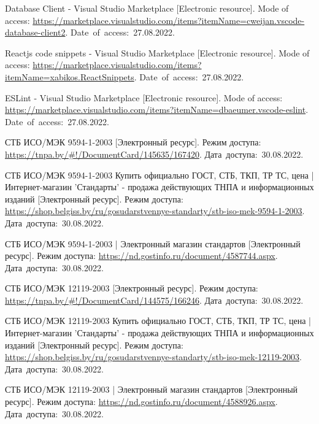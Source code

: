 \begin{thebibliography}{}
    Database Client - Visual Studio Marketplace
    [Electronic resource].
    Mode of access: \url{https://marketplace.visualstudio.com/items?itemName=cweijan.vscode-database-client2}.
    Date~of~access:~27.08.2022.
  
    Reactjs code snippets - Visual Studio Marketplace
    [Electronic resource].
    Mode of access: \url{https://marketplace.visualstudio.com/items?itemName=xabikos.ReactSnippets}.
    Date~of~access:~27.08.2022.
  
    ESLint - Visual Studio Marketplace
    [Electronic resource].
    Mode of access: \url{https://marketplace.visualstudio.com/items?itemName=dbaeumer.vscode-eslint}.
    Date~of~access:~27.08.2022.
  
  
  
    СТБ ИСО/МЭК 9594-1-2003
    [Электронный ресурс].
    Режим доступа: \url{https://tnpa.by/#!/DocumentCard/145635/167420}.
    Дата~доступа:~30.08.2022.
  
    СТБ ИСО/МЭК 9594-1-2003 Купить официально ГОСТ, СТБ, ТКП, ТР ТС, цена | Интернет-магазин 'Стандарты' - продажа действующих ТНПА и информационных изданий
    [Электронный ресурс].
    Режим доступа: \url{https://shop.belgiss.by/ru/gosudarstvennye-standarty/stb-iso-mek-9594-1-2003}.
    Дата~доступа:~30.08.2022.
  
    СТБ ИСО/МЭК 9594-1-2003 | Электронный магазин стандартов
    [Электронный ресурс].
    Режим доступа: \url{https://nd.gostinfo.ru/document/4587744.aspx}.
    Дата~доступа:~30.08.2022.
  
  
  
    СТБ ИСО/МЭК 12119-2003
    [Электронный ресурс].
    Режим доступа: \url{https://tnpa.by/#!/DocumentCard/144575/166246}.
    Дата~доступа:~30.08.2022.
  
    СТБ ИСО/МЭК 12119-2003 Купить официально ГОСТ, СТБ, ТКП, ТР ТС, цена | Интернет-магазин 'Стандарты' - продажа действующих ТНПА и информационных изданий
    [Электронный ресурс].
    Режим доступа: \url{https://shop.belgiss.by/ru/gosudarstvennye-standarty/stb-iso-mek-12119-2003}.
    Дата~доступа:~30.08.2022.
  
    СТБ ИСО/МЭК 12119-2003 | Электронный магазин стандартов
    [Электронный ресурс].
    Режим доступа: \url{https://nd.gostinfo.ru/document/4588926.aspx}.
    Дата~доступа:~30.08.2022.
  

\end{thebibliography}
